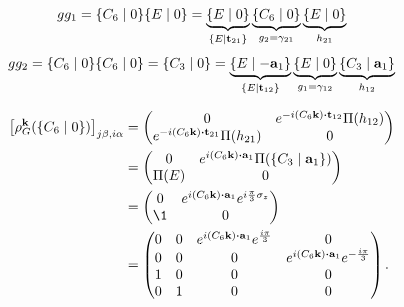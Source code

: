 \begin{itemize}
\begin{equation} \label{eq:spinful_graphene_generator_C6_g1_decomp}
gg_1 = \{C_6 \mid 0\} \{E \mid 0\} = \underbrace{\{E \mid 0\}}_{\{E\mid{\vb{t}}_{21}\}} \underbrace{\{C_6 \mid 0\}}_{g_2 = \gamma_{21}} \underbrace{\{E \mid 0\}}_{h_{21}}
\end{equation}
\begin{equation} \label{eq:spinful_graphene_generator_C6_g2_decomp}
gg_2 = \{C_6 \mid 0\} \{C_6 \mid 0\} = \{C_3 \mid 0\} =  \underbrace{\{E \mid -{\vb{a}}_1\}}_{\{E\mid{\vb{t}}_{12}\}} \underbrace{\{E \mid 0\}}_{g_1 = \gamma_{12}} \underbrace{\{C_3 \mid {\vb{a}}_1\}}_{h_{12}}
\end{equation}

\begin{align} \label{eq:rhoC6_inducedrep_k_jbia}
\qty[\rho_G^\k(\{C_6\mid0\})]_{j\beta,i\alpha} &=
\begin{pmatrix}
0 & e^{-i(C_6 \k) \vdot \t_{12}} \Pi(h_{12}) \\
e^{-i(C_6 \k) \vdot \t_{21}} \Pi(h_{21}) & 0
\end{pmatrix} \\
&=
\begin{pmatrix}
0 & e^{i (C_6 \k) \vdot \a_1} \Pi(\{C_3 \mid \a_1\}) \\
\Pi(E) & 0
\end{pmatrix} \\
&=
\begin{pmatrix}
0 & e^{i (C_6 \k) \vdot \a_1} e^{i\frac{\pi}{3}\sigma_z} \\
\1 & 0
\end{pmatrix} \\
&=
\begin{pmatrix}
0 & 0 & e^{i (C_6 \k) \vdot \a_1} e^{\frac{i\pi}{3}} & 0 \\
0 & 0 & 0 & e^{i (C_6 \k) \vdot \a_1} e^{-\frac{i\pi}{3}} \\
1 & 0 & 0 & 0 \\
0 & 1 & 0 & 0 \\
\end{pmatrix}.
\end{align}


\end{itemize}
